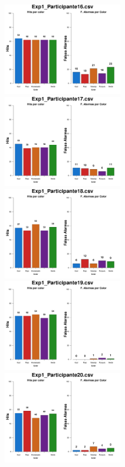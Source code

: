 \documentclass[a4paper ]{article}
\begin{document}
\begin{figure}[th]
\begin{center}
\includegraphics[width=8cm, height=4cm]{Figures/Color_Exp1_P16} \includegraphics[width=8cm, height=4cm]{Figures/Color_Exp1_P17} \includegraphics[width=8cm, height=4cm]{Figures/Color_Exp1_P18}
\includegraphics[width=8cm, height=4cm]{Figures/Color_Exp1_P19} \includegraphics[width=8cm, height=4cm]{Figures/Color_Exp1_P20} 
\end{center}
\end{figure}
\clearpage
\end{document}
